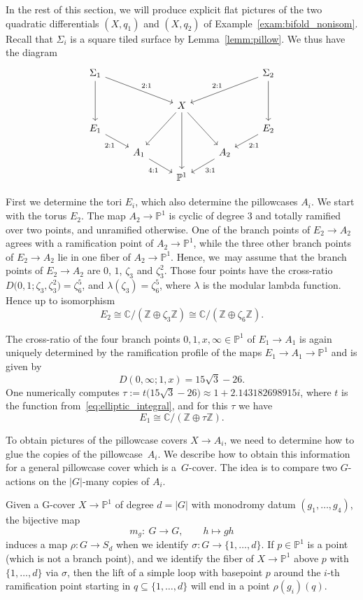 \documentclass[10pt,a4paper]{amsart}
\numberwithin{equation}{section}
\theoremstyle{definition}
\renewcommand{\to}{\rightarrow}
\newcommand{\ZZ}{\mathbb{Z}}
\newcommand{\Z}{\mathbb{Z}}
\newcommand{\CC}{\mathbb{C}}
\newcommand{\PP}{\mathbb{P}}
\begin{document}
In the rest of this section, we will produce explicit flat pictures of the two quadratic differentials $(X, q_1)$ and $(X, q_2)$ of Example~\ref{exam:bifold_nonisom}.
Recall that $\Sigma_i$ is a square tiled surface by Lemma~\ref{lemm:pillow}.
We thus have the diagram
\[
\begin{tikzcd}[row sep=small]
	\Sigma_1\ar[ddrr, "2:1"]\ar[ddd] &&&& \Sigma_2\ar[ddll, "2:1"']\ar[ddd] \\
	\\
	&& X\ar[ddd]\ar[ddl]\ar[ddr] && \\
	E_1\ar[dr, "2:1"'] &&&& E_2\ar[dl, "2:1"] \\
	& A_1\ar[dr, "4:1"'] && A_2\ar[dl, "3:1"] & \\
	&& \PP^1 &&
\end{tikzcd}
\]

First we determine the tori $E_i$, which also determine the pillowcases $A_i$. We start with the torus $E_2$.
The map $A_2 \to \PP^1$ is cyclic of degree $3$ and totally ramified over two points, and unramified otherwise. One of the branch points of $E_2 \to A_2$ agrees with a ramification point of $A_2 \to \PP^1$, while the three other branch points of $E_2 \to A_2$ lie in one fiber of $A_2 \to \PP^1$.
Hence, we~may assume that the branch points of $E_2 \to A_2$ are $0$, $1$, $\zeta_3$ and $\zeta_3^2$.
Those four points have the cross-ratio $D\bigl(0,1;\zeta_3,\zeta_3^2\bigr) = \zeta_6^5$, and $\lambda(\zeta_3) = \zeta_6^5$, where $\lambda$ is the modular lambda function.
Hence up to isomorphism
\[
	E_2 \cong \CC / (\ZZ \oplus \zeta_3 \Z) \cong \CC / (\ZZ \oplus \zeta_6 \ZZ).
\]

The cross-ratio of the four branch points $0, 1, x,\infty\in\PP^1$ of $E_1 \to A_1$ is again uniquely determined by the ramification profile of the maps $E_1 \to A_1 \to \PP^1$ and is given by
\[
	D(0,\infty;1,x) = 15\sqrt{3}-26.
\]
One numerically computes $\tau := t\bigl(15\sqrt{3}-26\bigr)\approx 1 + 2.143182698915i$, where $t$ is the function from~\eqref{eq:elliptic_integral}, and for this $\tau$ we have
\[
	E_1 \cong \CC / (\ZZ \oplus \tau\ZZ).
\]

To obtain pictures of the pillowcase covers $X \to A_i$, we need to determine how to glue the copies of the pillowcase~$A_i$.
We describe how to obtain this information for a general pillowcase cover which is a~$G$-cover.
The idea is to compare two $G$-actions on the $|G|$-many copies of $A_i$.

Given a G-cover $X \to \PP^1$ of degree $d=|G|$ with monodromy datum $(g_1, \dots, g_4)$, the bijective map
\[
	m_g\colon \ G \to G, \qquad h \mapsto gh
\]
induces a map $\rho\colon G \to S_d$ when we identify $\sigma\colon G \to \{1, \dots, d\}$.
If $p \in \PP^1$ is a point (which is not a branch point), and we identify the fiber of $X \to \PP^1$ above $p$ with $\{1, \dots, d\}$ via $\sigma$, then the lift of a simple loop with basepoint $p$ around the $i$-th ramification point starting in $q \subseteq \{1, \dots, d\}$ will end in a point $\rho(g_i)(q)$.
\end{document}
